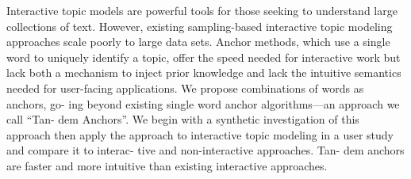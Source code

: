 Interactive topic models are powerful tools for those seeking to understand large collections of text. However, existing sampling-based interactive topic modeling approaches scale poorly to large data sets. Anchor methods, which use a single word to uniquely identify a topic, offer the speed needed for interactive work but lack both a mechanism to inject prior knowledge and lack the intuitive semantics needed for user-facing applications. We propose combinations of words as anchors, go- ing beyond existing single word anchor algorithms—an approach we call ``Tan- dem Anchors''. We begin with a synthetic investigation of this approach then apply the approach to interactive topic modeling in a user study and compare it to interac- tive and non-interactive approaches. Tan- dem anchors are faster and more intuitive than existing interactive approaches.
